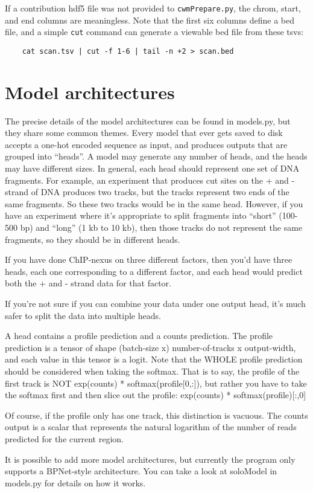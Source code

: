 \documentclass{article}
\begin{document}
If a contribution hdf5 file was not provided to \texttt{cwmPrepare.py}, the chrom, start,
and end columns are meaningless.
Note that the first six columns define a bed file, and a simple \texttt{cut}
command can generate a viewable bed file from these tsvs:

\begin{lstlisting}
    cat scan.tsv | cut -f 1-6 | tail -n +2 > scan.bed
\end{lstlisting}


\newpage
\section{Model architectures}\label{sec:modelArchitectures}

The precise details of the model architectures can be found in models.py, but they share some common themes.
Every model that ever gets saved to disk accepts a one-hot encoded sequence as input, and produces outputs that are grouped into ``heads''.
A model may generate any number of heads, and the heads may have different sizes.
In general, each head should represent one set of DNA fragments. For example, an experiment that produces cut sites on the + and - strand of DNA produces
two tracks, but the tracks represent two ends of the same fragments. So these two tracks would be in the same head.
However, if you have an experiment where it's appropriate to split fragments into ``short'' (100-500 bp) and ``long'' (1 kb to 10 kb), then
those tracks do not represent the same fragments, so they should be in different heads.

If you have done ChIP-nexus on three different factors, then you'd have three heads, each one corresponding to a different factor, and each head would predict both the + and - strand data for that factor.

If you're not sure if you can combine your data under one output head, it's much safer to split the data into multiple heads.

A head contains a profile prediction and a counts prediction. The profile prediction is a tensor of shape (batch-size x) number-of-tracks x output-width, and each value in this tensor is a logit.
Note that the WHOLE profile prediction should be considered when taking the softmax.
That is to say, the profile of the first track is NOT exp(counts) * softmax(profile[0,:]), but rather you have to take the softmax first and then slice out the profile: exp(counts) * softmax(profile)[:,0]

Of course, if the profile only has one track, this distinction is vacuous.
The counts output is a scalar that represents the natural logarithm of the number of reads predicted for the current region.

It is possible to add more model architectures, but currently the program only supports a BPNet-style architecture. You can take a look at soloModel in models.py for details on how it works.
\end{document}

